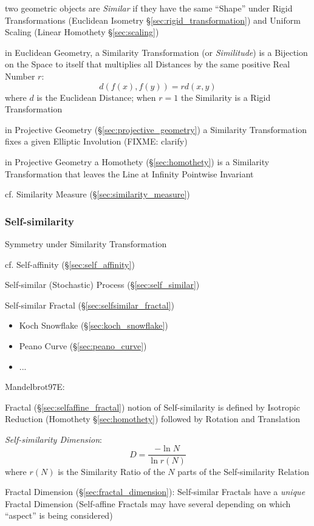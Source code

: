 two geometric objects are \emph{Similar} if they have the same ``Shape'' under
Rigid Transformations (Euclidean Isometry \S\ref{sec:rigid_transformation}) and
Uniform Scaling (Linear Homothety \S\ref{sec:scaling})

in Euclidean Geometry, a Similarity Transformation (or \emph{Similitude}) is a
Bijection on the Space to itself that multiplies all Distances by the same
positive Real Number $r$:
\[
  d(f(x), f(y)) = r d(x, y)
\]
where $d$ is the Euclidean Distance; when $r = 1$ the Similarity is a
Rigid Transformation

in Projective Geometry (\S\ref{sec:projective_geometry}) a Similarity
Transformation fixes a given Elliptic Involution (FIXME: clarify)

in Projective Geometry a Homothety (\S\ref{sec:homothety}) is a Similarity
Transformation that leaves the Line at Infinity Pointwise Invariant

\fist cf. Similarity Measure (\S\ref{sec:similarity_measure})



\subsubsection{Self-similarity}\label{sec:self_similarity}

Symmetry under Similarity Transformation

cf. Self-affinity (\S\ref{sec:self_affinity})

\fist Self-similar (Stochastic) Process (\S\ref{sec:self_similar})

Self-similar Fractal (\S\ref{sec:selfsimilar_fractal})

\begin{itemize}
  \item Koch Snowflake (\S\ref{sec:koch_snowflake})
  \item Peano Curve (\S\ref{sec:peano_curve})
  \item ...
\end{itemize}

Mandelbrot97E:

Fractal (\S\ref{sec:selfaffine_fractal}) notion of Self-similarity is defined by
Isotropic Reduction (Homothety \S\ref{sec:homothety}) followed by Rotation and
Translation

\emph{Self-similarity Dimension}:
\[
  D = \frac{-\ln N}{\ln r(N)}
\]
where $r(N)$ is the Similarity Ratio of the $N$ parts of the Self-similarity
Relation

\fist Fractal Dimension (\S\ref{sec:fractal_dimension}): Self-similar Fractals
have a \emph{unique} Fractal Dimension (Self-affine Fractals may have several
depending on which ``aspect'' is being considered)

